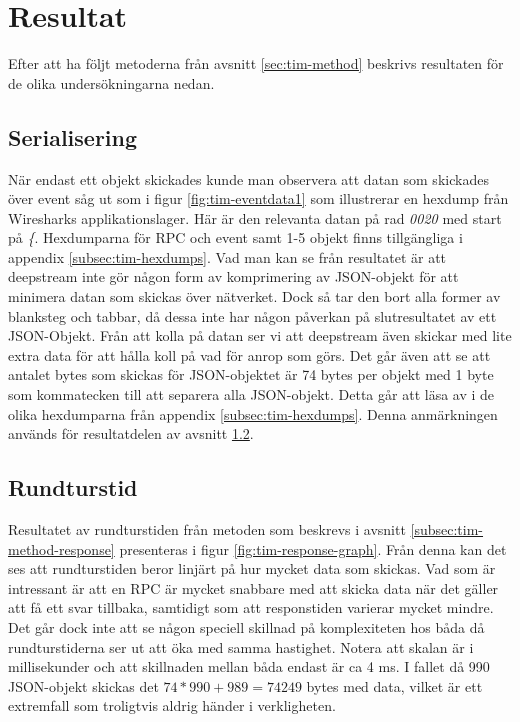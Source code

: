 \section{Resultat}
\label{sec:tim-results}
Efter att ha följt metoderna från avsnitt \ref{sec:tim-method} beskrivs resultaten för de olika undersökningarna nedan. 

\subsection{Serialisering}
När endast ett objekt skickades kunde man observera att datan som skickades över event såg ut som i figur \ref{fig:tim-eventdata1} som illustrerar en hexdump från Wiresharks applikationslager. Här är den relevanta datan på rad \textit{0020} med start på \textit{\{}. Hexdumparna för RPC och event samt 1-5 objekt finns tillgängliga i appendix \ref{subsec:tim-hexdumps}. Vad man kan se från resultatet är att deepstream inte gör någon form av komprimering av JSON-objekt för att minimera datan som skickas över nätverket. Dock så tar den bort alla former av blanksteg och tabbar, då dessa inte har någon påverkan på slutresultatet av ett JSON-Objekt. Från att kolla på datan ser vi att deepstream även skickar med lite extra data för att hålla koll på vad för anrop som görs. Det går även att se att antalet bytes som skickas för JSON-objektet är 74 bytes per objekt med 1 byte som kommatecken till att separera alla JSON-objekt. Detta går att läsa av i de olika hexdumparna från appendix \ref{subsec:tim-hexdumps}. Denna anmärkningen används för resultatdelen av avsnitt \ref{subsec:tim-result-response}.

\subsection{Rundturstid}
\label{subsec:tim-result-response}
Resultatet av rundturstiden från metoden som beskrevs i avsnitt \ref{subsec:tim-method-response} presenteras i figur \ref{fig:tim-response-graph}. Från denna kan det ses att rundturstiden beror linjärt på hur mycket data som skickas. Vad som är intressant är att en RPC är mycket snabbare med att skicka data när det gäller att få ett svar tillbaka, samtidigt som att responstiden varierar mycket mindre. Det går dock inte att se någon speciell skillnad på komplexiteten hos båda då rundturstiderna ser ut att öka med samma hastighet. Notera att skalan är i millisekunder och att skillnaden mellan båda endast är ca 4 ms. I fallet då 990 JSON-objekt skickas det $74*990+989=74249$ bytes med data, vilket är ett extremfall som troligtvis aldrig händer i verkligheten.

